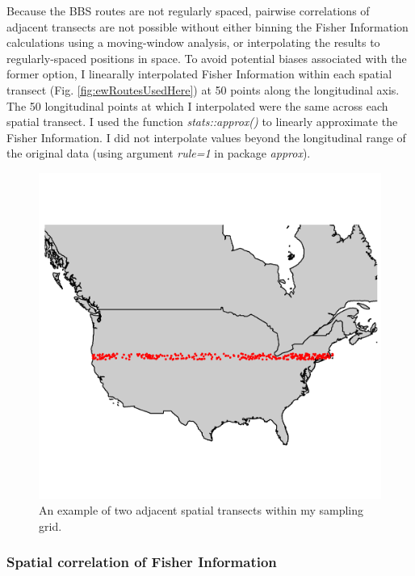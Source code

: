 \documentclass[12pt,twoside,openany]{reedthesis}
\begin{document}
Because the BBS routes are not regularly spaced, pairwise correlations of adjacent transects are not possible without either binning the Fisher Information calculations using a moving-window analysis, or interpolating the results to regularly-spaced positions in space. To avoid potential biases associated with the former option, I linearally interpolated Fisher Information within each spatial transect (Fig. \ref{fig:ewRoutesUsedHere}) at 50 points along the longitudinal axis. The 50 longitudinal points at which I interpolated were the same across each spatial transect. I used the function \emph{stats::approx()} to linearly approximate the Fisher Information. I did not interpolate values beyond the longitudinal range of the original data (using argument \emph{rule=1} in package \emph{approx}).
\begin{figure}
\includegraphics[width=0.85\linewidth]{./chapterFiles/fisherSpatial/figures/figsCalledInDiss/transectSamplingEx_1row} \caption{An example of two adjacent spatial transects within my sampling grid.}\label{fig:oneTsectEx}
\end{figure}
\hypertarget{spatial-correlation-of-fisher-information}{%
\subsubsection{Spatial correlation of Fisher Information}\label{spatial-correlation-of-fisher-information}}
\end{document}
